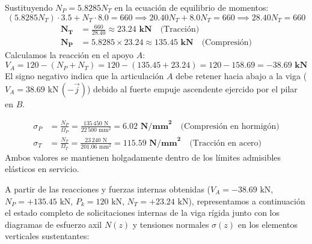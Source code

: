 {    Sustituyendo $N_P = 5.8285 N_T$ en la ecuación de equilibrio de momentos:
    \begin{equation}
        (5.8285 N_T) \cdot 3.5 + N_T \cdot 8.0 = 660 \implies 20.40 N_T + 8.0 N_T = 660 \implies 28.40 N_T = 660
    \end{equation}
    \begin{align}
        \mathbf{N_T} & = \frac{660}{28.40} \approx \mathbf{23.24\text{ kN}} \quad \text{(Tracción)}      \\
        \mathbf{N_P} & = 5.8285 \times 23.24 \approx \mathbf{135.45\text{ kN}} \quad \text{(Compresión)}
    \end{align}
    Calculamos la reacción en el apoyo $A$:
    \begin{equation}
        V_A = 120 - (N_P + N_T) = 120 - (135.45 + 23.24) = 120 - 158.69 = \mathbf{-38.69\text{ kN}}
    \end{equation}
    El signo negativo indica que la articulación $A$ debe retener hacia abajo a la viga ($V_A = 38.69\text{ kN}\,(-\vec{j})$) debido al fuerte empuje ascendente ejercido por el pilar en $B$.


    \begin{align}
        \sigma_P & = \frac{N_P}{\Omega_P} = \frac{135\,450\text{ N}}{22\,500\text{ mm}^2} = \mathbf{6.02\text{ N/mm}^2} \quad \text{(Compresión en hormigón)} \\
        \sigma_T & = \frac{N_T}{\Omega_T} = \frac{23\,240\text{ N}}{201.06\text{ mm}^2} = \mathbf{115.59\text{ N/mm}^2} \quad \text{(Tracción en acero)}
    \end{align}
    Ambos valores se mantienen holgadamente dentro de los límites admisibles elásticos en servicio.
}    

A partir de las reacciones y fuerzas internas obtenidas ($V_A = -38.69\text{ kN}$, $N_P = +135.45\text{ kN}$, $P_k = 120\text{ kN}$, $N_T = +23.24\text{ kN}$), representamos a continuación el estado completo de solicitaciones internas de la viga rígida junto con los diagramas de esfuerzo axil $N(z)$ y tensiones normales $\sigma(z)$ en los elementos verticales sustentantes:

